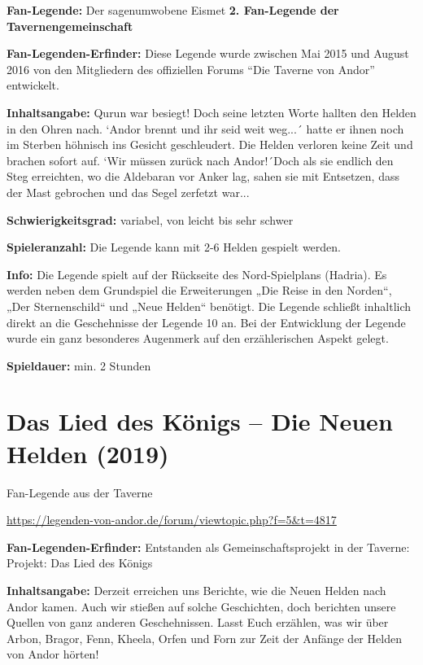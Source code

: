 {


\textbf{Fan-Legende:} Der sagenumwobene Eismet
\textbf{2. Fan-Legende der Tavernengemeinschaft}

\textbf{Fan-Legenden-Erfinder:} Diese Legende wurde zwischen Mai 2015 und August 2016 von den Mitgliedern des offiziellen Forums “Die Taverne von Andor” entwickelt.

\textbf{Inhaltsangabe:} Qurun war besiegt! Doch seine letzten Worte hallten den Helden in den Ohren nach. `Andor brennt und ihr seid weit weg...´ hatte er ihnen noch im Sterben höhnisch ins Gesicht geschleudert. Die Helden verloren keine Zeit und brachen sofort auf. `Wir müssen zurück nach Andor!´Doch als sie endlich den Steg erreichten, wo die Aldebaran vor Anker lag, sahen sie mit Entsetzen, dass der Mast gebrochen und das Segel zerfetzt war...

\textbf{Schwierigkeitsgrad:} variabel, von leicht bis sehr schwer

\textbf{Spieleranzahl:} Die Legende kann mit 2-6 Helden gespielt werden.

\textbf{Info:}
Die Legende spielt auf der Rückseite des Nord-Spielplans (Hadria). Es werden neben dem Grundspiel die Erweiterungen „Die Reise in den Norden“, „Der Sternenschild“ und „Neue Helden“ benötigt.
Die Legende schließt inhaltlich direkt an die Geschehnisse der Legende 10 an. Bei der Entwicklung der Legende wurde ein ganz besonderes Augenmerk auf den erzählerischen Aspekt gelegt.

\textbf{Spieldauer:} min. 2 Stunden








\newpage
\section{Das Lied des Königs – Die Neuen Helden (2019)}

\begin{center}
    Fan-Legende aus der Taverne

    \url{https://legenden-von-andor.de/forum/viewtopic.php?f=5&t=4817}
\end{center}



\textbf{Fan-Legenden-Erfinder:}
Entstanden als Gemeinschaftsprojekt in der Taverne: Projekt: Das Lied des Königs

\textbf{Inhaltsangabe:}
Derzeit erreichen uns Berichte, wie die Neuen Helden nach Andor kamen. Auch wir stießen auf solche Geschichten, doch berichten unsere Quellen von ganz anderen Geschehnissen.
Lasst Euch erzählen, was wir über Arbon, Bragor, Fenn, Kheela, Orfen und Forn zur Zeit der Anfänge der Helden von Andor hörten!

}
